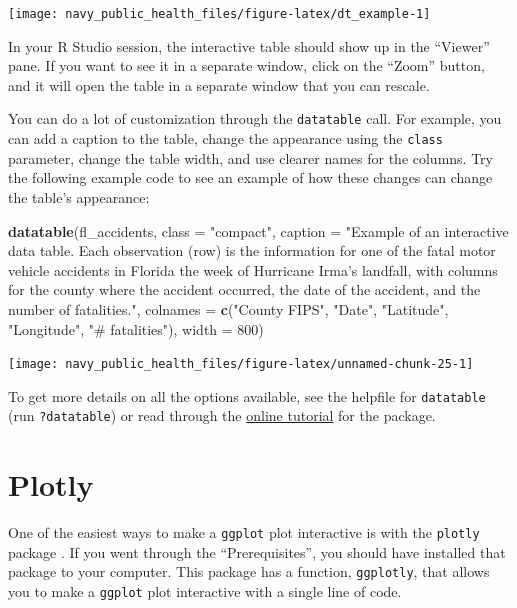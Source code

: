 \documentclass[]{tufte-book}
\newenvironment{Shaded}{}{}
\newcommand{\DataTypeTok}[1]{\textcolor[rgb]{0.56,0.13,0.00}{#1}}
\newcommand{\DecValTok}[1]{\textcolor[rgb]{0.25,0.63,0.44}{#1}}
\newcommand{\KeywordTok}[1]{\textcolor[rgb]{0.00,0.44,0.13}{\textbf{#1}}}
\newcommand{\NormalTok}[1]{#1}
\newcommand{\StringTok}[1]{\textcolor[rgb]{0.25,0.44,0.63}{#1}}
\begin{document}
\texttt{[image: navy\_public\_health\_files/figure-latex/dt\_example-1]}

In your R Studio session, the interactive table should show up
in the ``Viewer'' pane. If you want to see it in a separate window, click on the ``Zoom'' button,
and it will open the table in a separate window that you can rescale.

You can do a lot of customization through the \texttt{datatable} call. For example, you can
add a caption to the table, change the appearance using the \texttt{class} parameter, change the
table width, and
use clearer names for the columns. Try the following example code to see an example of how these
changes can change the table's appearance:

\begin{Shaded}
\begin{Highlighting}[]
\KeywordTok{datatable}\NormalTok{(fl_accidents, }\DataTypeTok{class =} \StringTok{"compact"}\NormalTok{, }\DataTypeTok{caption =} \StringTok{"Example of an interactive data table. Each observation (row) is the information for one of the fatal motor vehicle accidents in Florida the week of Hurricane Irma's landfall, with columns for the county where the accident occurred, the date of the accident, and the number of fatalities."}\NormalTok{, }
    \DataTypeTok{colnames =} \KeywordTok{c}\NormalTok{(}\StringTok{"County FIPS"}\NormalTok{, }\StringTok{"Date"}\NormalTok{, }\StringTok{"Latitude"}\NormalTok{, }
        \StringTok{"Longitude"}\NormalTok{, }\StringTok{"# fatalities"}\NormalTok{), }\DataTypeTok{width =} \DecValTok{800}\NormalTok{)}
\end{Highlighting}
\end{Shaded}

\texttt{[image: navy\_public\_health\_files/figure-latex/unnamed-chunk-25-1]}

To get more details on all the options available, see the helpfile for \texttt{datatable} (run \texttt{?datatable}) or read through the \href{}{online tutorial} for the package.

\hypertarget{plotly}{%
\section{Plotly}\label{plotly}}

One of the easiest ways to make a \texttt{ggplot} plot interactive is with the \texttt{plotly} package \citep{R-plotly}.
If you went through the ``Prerequisites'', you should have installed that package to your
computer. This package has a function, \texttt{ggplotly}, that allows you to make a \texttt{ggplot}
plot interactive with a single line of code.
\end{document}
